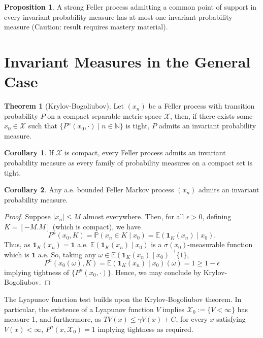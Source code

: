 \documentclass[]{article}
\theoremstyle{definition}
\newtheorem*{theorem}{Theorem}
\newtheorem*{corollary}{Corollary}
\newtheorem*{proposition}{Proposition}
\begin{document}
\begin{proposition}
  A strong Feller process admitting a common point of support in every invariant 
  probability measure has at most one invariant probability measure (Caution: result 
  requires mastery material).
\end{proposition}

\section*{Invariant Measures in the General Case}

\begin{theorem}[Krylov-Bogoliubov]
  Let \((x_n)\) be a Feller process with transition probability \(P\) on a compact 
  separable metric space \(\mathcal{X}\), then, if there exists some \(x_0 \in \mathcal{X}\)
  such that \(\{P^n(x_0, \cdot) \mid n \in \mathbb{N}\}\) is tight, \(P\) admits 
  an invariant probability measure.
\end{theorem}

\begin{corollary}
  If \(\mathcal{X}\) is compact, every Feller process admits an invariant probability 
  measure as every family of probability measures on a compact set is tight.
\end{corollary}

\begin{corollary}
  Any a.e. bounded Feller Markov process \((x_n)\) admits an invariant probability measure.
\end{corollary}
\begin{proof}
  Suppose \(|x_n| \le M\) almost everywhere. Then, for all \(\epsilon > 0\), 
  defining \(K = [-M. M]\) (which is compact), we have 
  \[P^n(x_0, K) = \mathbb{P}(x_n \in K \mid x_0) = \mathbb{E}(\mathbf{1}_K(x_n) \mid x_0).\]
  Thus, as \(\mathbf{1}_K(x_n) = \mathbf{1}\) a.e. \(\mathbb{E}(\mathbf{1}_K(x_n) \mid x_0)\) 
  is a \(\sigma(x_0)\)-measurable function which is \(\mathbf{1}\) a.e. So, 
  taking any \(\omega \in \mathbb{E}(\mathbf{1}_K(x_n) \mid x_0)^{-1}\{1\}\), 
  \[P^n(x_0(\omega), K) = \mathbb{E}(\mathbf{1}_K(x_n) \mid x_0)(\omega) = 1 \ge 1 - \epsilon\]
  implying tightness of \(\{P^n(x_0, \cdot)\}\). Hence, we may conclude by Krylov-Bogoliubov.
\end{proof}

The Lyapunov function test builds upon the Krylov-Bogoliubov theorem. In particular, 
the existence of a Lyapunov function \(V\) implies \(\mathcal{X}_0 := \{V < \infty\}\) 
has measure 1, and furthermore, as \(TV(x) \le \gamma V(x) + C\), for every 
\(x\) satisfying \(V(x) < \infty\), \(P^n(x, \mathcal{X}_0) = 1\) implying tightness 
as required.
\end{document}
